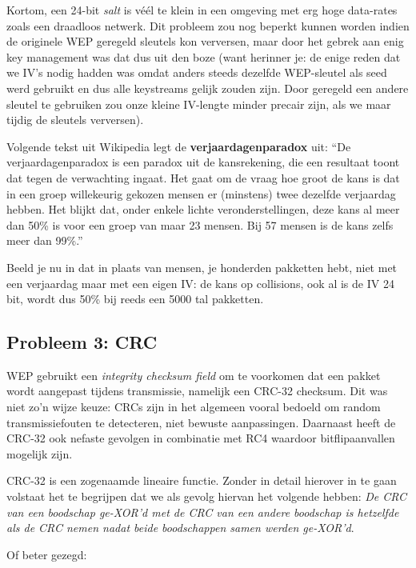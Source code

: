 \documentclass[
  10pt,
  dutch,
  paper=a4,
  ,captions=tableheading
]{scrbook}
\begin{document}
Kortom, een 24-bit \emph{salt} is véél te klein in een omgeving met erg
hoge data-rates zoals een draadloos netwerk. Dit probleem zou nog
beperkt kunnen worden indien de originele WEP geregeld sleutels kon
verversen, maar door het gebrek aan enig key management was dat dus uit
den boze (want herinner je: de enige reden dat we IV's nodig hadden was
omdat anders steeds dezelfde WEP-sleutel als seed werd gebruikt en dus
alle keystreams gelijk zouden zijn. Door geregeld een andere sleutel te
gebruiken zou onze kleine IV-lengte minder precair zijn, als we maar
tijdig de sleutels verversen).

\begin{noteblock}
Volgende tekst uit Wikipedia legt de \textbf{verjaardagenparadox} uit:
``De verjaardagenparadox is een paradox uit de kansrekening, die een
resultaat toont dat tegen de verwachting ingaat. Het gaat om de vraag
hoe groot de kans is dat in een groep willekeurig gekozen mensen er
(minstens) twee dezelfde verjaardag hebben. Het blijkt dat, onder enkele
lichte veronderstellingen, deze kans al meer dan 50\% is voor een groep
van maar 23 mensen. Bij 57 mensen is de kans zelfs meer dan 99\%.''

Beeld je nu in dat in plaats van mensen, je honderden pakketten hebt,
niet met een verjaardag maar met een eigen IV: de kans op collisions,
ook al is de IV 24 bit, wordt dus 50\% bij reeds een 5000 tal pakketten.
\end{noteblock}

\subsection{Probleem 3: CRC}\label{probleem-3-crc}

WEP gebruikt een \emph{integrity checksum field} om te voorkomen dat een
pakket wordt aangepast tijdens transmissie, namelijk een CRC-32
checksum. Dit was niet zo'n wijze keuze: CRCs zijn in het algemeen
vooral bedoeld om random transmissiefouten te detecteren, niet bewuste
aanpassingen. Daarnaast heeft de CRC-32 ook nefaste gevolgen in
combinatie met RC4 waardoor bitflipaanvallen mogelijk zijn.

CRC-32 is een zogenaamde lineaire functie. Zonder in detail hierover in
te gaan volstaat het te begrijpen dat we als gevolg hiervan het volgende
hebben: \emph{De CRC van een boodschap ge-XOR'd met de CRC van een
andere boodschap is hetzelfde als de CRC nemen nadat beide boodschappen
samen werden ge-XOR'd}.

Of beter gezegd:
\end{document}
